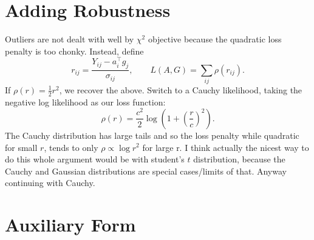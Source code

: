 \documentclass[11pt]{article}
\begin{document}
\section*{Adding Robustness}

Outliers are not dealt with well by $\chi^2$ objective because the quadratic loss penalty is too chonky.
Instead, define
\begin{equation}
    r_{ij} = \frac{Y_{ij} - a_i^\top g_j}{\sigma_{ij}}, \qquad 
    L(A,G) = \sum_{ij} \rho(r_{ij}).
\end{equation}
If $\rho(r) = \tfrac{1}{2} r^2$, we recover the above. 
Switch to a Cauchy likelihood, taking the negative log likelihood as our loss function:
\begin{equation}
    \rho(r) = \frac{c^2}{2} \log\!\left(1 + \left(\frac{r}{c}\right)^2\right).
\end{equation}
The Cauchy distribution has large tails and so the loss penalty while quadratic for small $r$, tends to only $\rho \propto \log{r^2}$ for large r.
I think actually the nicest way to do this whole argument would be with student's $t$ distribution, because the Cauchy and Gaussian distributions are special cases/limits of that.
Anyway continuing with Cauchy.

\section*{Auxiliary Form}
\end{document}

